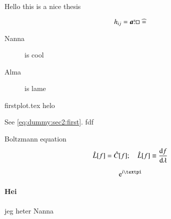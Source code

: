 

Hello this is a nice thesis

\begin{equation}\label{eq:dummy:sec2:first}
    h_{ij} = \boldsymbol{a} \overset{\text{s}}{.} \Box \mathrel{\widehat{=}} 
\end{equation}


\begin{description}
    \item[Nanna] is cool 
    \item[Alma] is lame 
\end{description}


{firstplot.tex}
helo

\cite{amrParticleProductionGravitational2019, azatovDarkMatterProduction2021}

See \ref{eq:dummy:sec2:first}. fdf \cite{vachaspatiKinksDomainWalls2006}

Boltzmann equation
\begin{equation}
    \hat{L}[f] = \hat{C}[f]; \quad \hat{L}[f]\equiv \dv{f}{\lambda}
\end{equation}

\begin{equation}
   \eu[\im \ppi]
\end{equation}

\paragraph*{Hei} jeg heter Nanna